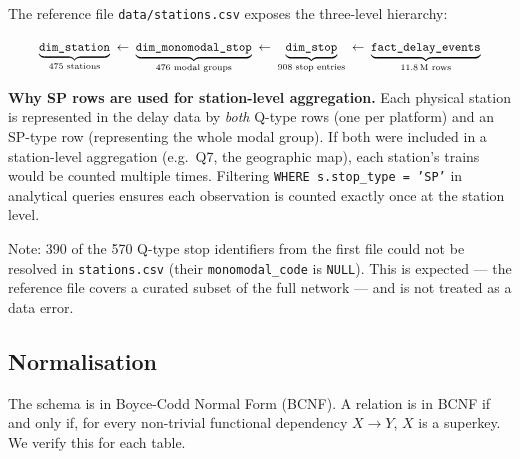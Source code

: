 \documentclass[a4paper,11pt]{article}
\begin{document}
The reference file \texttt{data/stations.csv} exposes the three-level hierarchy:

\[
\scalebox{0.88}{$\displaystyle
  \underbrace{\texttt{dim\_station}}_{\text{475 stations}}
  \;\leftarrow\;
  \underbrace{\texttt{dim\_monomodal\_stop}}_{\text{476 modal groups}}
  \;\leftarrow\;
  \underbrace{\texttt{dim\_stop}}_{\text{908 stop entries}}
  \;\leftarrow\;
  \underbrace{\texttt{fact\_delay\_events}}_{\text{11.8\,M rows}}
$}
\]

\textbf{Why SP rows are used for station-level aggregation.}
Each physical station is represented in the delay data by \emph{both} Q-type rows
(one per platform) and an SP-type row (representing the whole modal group).
If both were included in a station-level aggregation (e.g.\ Q7, the geographic
map), each station's trains would be counted multiple times.
Filtering \texttt{WHERE s.stop\_type = 'SP'} in analytical queries ensures each
observation is counted exactly once at the station level.

Note: 390 of the 570 Q-type stop identifiers from the first file could not be
resolved in \texttt{stations.csv} (their \texttt{monomodal\_code} is \texttt{NULL}).
This is expected --- the reference file covers a curated subset of the full network
--- and is not treated as a data error.

\subsection{Normalisation}

The schema is in Boyce-Codd Normal Form (BCNF).
A relation is in BCNF if and only if, for every non-trivial functional dependency
$X \to Y$, $X$ is a superkey.
We verify this for each table.
\end{document}

